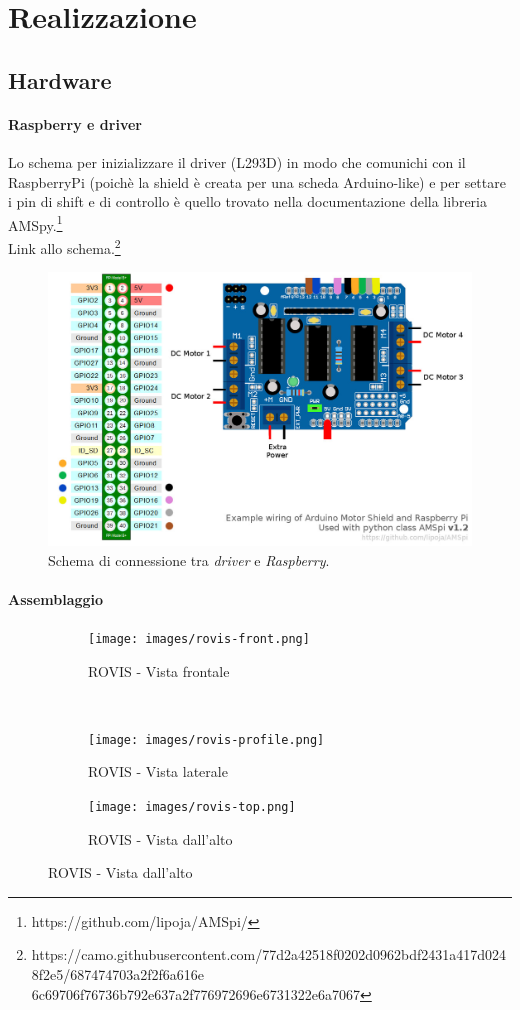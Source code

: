 \documentclass[11pt]{article}
\begin{document}
\section{Realizzazione}
\subsection{Hardware} 
\paragraph{Raspberry e driver}
Lo schema per inizializzare il driver (L293D) in modo che comunichi con il RaspberryPi (poichè la shield è creata per una scheda Arduino-like) e per settare i pin di shift e di controllo è quello trovato nella documentazione della libreria AMSpy.\footnote{https://github.com/lipoja/AMSpi/}\\
Link allo schema.\footnote{https://camo.githubusercontent.com/77d2a42518f0202d0962bdf2431a417d0248f2e5/687474703a2f2f6a616e\\6c69706f76736b792e637a2f776972696e6731322e6a7067}
	\begin{figure}[htp]
		\includegraphics[width=\textwidth]{images/schemaROVIS.jpeg}
		\caption{Schema di connessione tra \textit{driver} e \textit{Raspberry}. }
		\label{fig:schema-driver}
	\end{figure}
\paragraph{Assemblaggio}
\begin{figure}[htp]
	\centering
	\begin{subfigure}[b]{0.5\textwidth}
		\texttt{[image: images/rovis-front.png]}
		\caption{ROVIS - Vista frontale}
		\label{fig:rovis-front}
	\end{subfigure}
	\\
	\begin{subfigure}[b]{0.5\textwidth}	
		\texttt{[image: images/rovis-profile.png]}
		\caption{ROVIS - Vista laterale}
		\label{fig:rovis-profile}
	\end{subfigure}
	\begin{subfigure}[b]{0.5\textwidth}
		\texttt{[image: images/rovis-top.png]}
		\caption{ROVIS - Vista dall'alto}
		\label{fig:rovis-top}
	\end{subfigure}
\end{figure}
\end{document}
